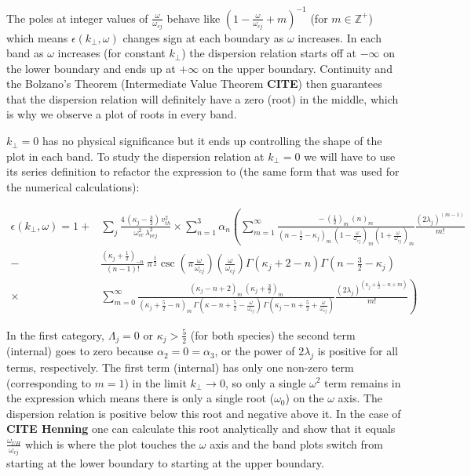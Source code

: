 \documentclass[12pt,a4paper]{article}
\begin{document}
    The poles at integer values of $\frac{\omega}{\omega_{cj}}$ behave like $(1 - \frac{\omega}{\omega_{cj}} + m)^{-1}$ (for $m \in \mathbb{Z}^+$) which means $\epsilon(k_\perp, \omega)$ changes sign at each boundary as $\omega$ increases.
    In each band as $\omega$ increases (for constant $k_\perp$) the dispersion relation starts off at $-\infty$ on the lower boundary and ends up at $+\infty$ on the upper boundary.
    Continuity and the Bolzano's Theorem (Intermediate Value Theorem \textbf{CITE}) then guarantees that the dispersion relation will definitely have a zero (root) in the middle, which is why we observe a plot of roots in every band.


    $k_\perp = 0$ has no physical significance but it ends up controlling the shape of the plot in each band. To study the dispersion relation at $k_\perp = 0$ we will have to use its series definition to refactor the expression to (the same form that was used for the numerical calculations):

    \begin{align}
        \epsilon(k_\perp, \omega) = 1 +& \sum_j \frac{4 \, (\kappa_j - \frac{3}{2}) \, v^2_{th}}{\omega^2_{ce} \, \lambda^2_{\nu c j}} \times \sum_{n = 1}^3 \alpha_n \left( \sum_{m = 1}^\infty \frac{ -\, (\frac{1}{2})_m \, (n)_m }{(n - \frac{1}{2} - \kappa_j)_m \, (1 - \frac{\omega}{\omega_{cj}})_m (1 + \frac{\omega}{\omega_{cj}})_m } \frac{(2 \lambda_j)^{(m - 1)}}{m!} \right. \\
        -& \left. \frac{(\kappa_j + \frac{1}{2})_{-n}}{(n - 1)!} \, \pi^{\frac{1}{2}} \csc\left(\pi \frac{\omega}{\omega_{cj}}\right) \left(\frac{\omega}{\omega_{cj}}\right) \Gamma(\kappa_j + 2 - n) \Gamma(n - \frac{3}{2} - \kappa_j) \right.\\
        \times& \left. \sum_{m = 0}^\infty \frac{(\kappa_j - n + 2)_m \, (\kappa_j + \frac{3}{2})_m}{(\kappa_j + \frac{5}{2} - n)_m \, \Gamma(\kappa - n + \frac{5}{2} - \frac{\omega}{\omega_{cj}}) \, \Gamma(\kappa_j - n + \frac{5}{2} + \frac{\omega}{\omega_{cj}})} \frac{(2 \lambda_j)^{(\kappa_j + \frac{1}{2} - n + m)}}{m!} \right)
    \end{align}

    In the first category, $\Lambda_j = 0$ or $\kappa_j > \frac{5}{2}$ (for both species) the second term (internal) goes to zero because $\alpha_2 = 0 = \alpha_3$, or the power of $2 \lambda_j$ is positive for all terms, respectively.
    The first term (internal) has only one non-zero term (corresponding to $m = 1$) in the limit $k_\perp \rightarrow 0$, so only a single $\omega^2$ term remains in the expression which means there is only a single root ($\omega_0$) on the $\omega$ axis.
    The dispersion relation is positive below this root and negative above it.
    In the case of \textbf{CITE Henning} one can calculate this root analytically and show that it equals $\frac{\omega_{UH}}{\omega_{cj}}$ which is where the plot touches the $\omega$ axis and the band plots switch from starting at the lower boundary to starting at the upper boundary.
\end{document}
